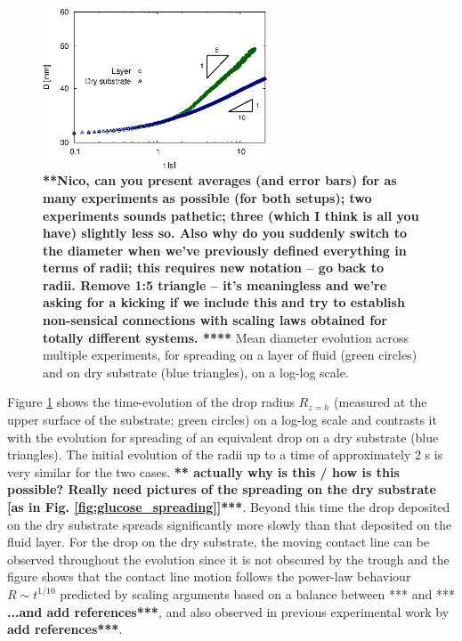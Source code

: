 \documentclass[aip,graphicx]{revtex4-1}
\begin{document}
\begin{figure}[!ht]
\centering
\includegraphics[width=0.6\textwidth]{figures/diam_vs_time_comp_layer_dry.eps}
\caption{{\bf ***Nico, can you present averages (and error bars) for as
  many experiments as possible (for both setups); two experiments
  sounds pathetic; three (which I think is all you have) slightly 
  less so. Also why do you suddenly switch to
  the diameter when we've previously defined everything in terms of
  radii; this requires new notation -- go back to radii. 
  Remove 1:5 triangle -- it's meaningless and we're asking for
  a kicking if we include this and try to establish non-sensical
  connections with scaling laws obtained for totally different
  systems. ****} Mean diameter evolution across multiple experiments, for
  spreading on a layer of fluid (green circles) and on dry substrate
  (blue triangles), on a log-log
  scale. }
\label{fig:diam_vs_time_comp_layer_dry}
\end{figure}


Figure \ref{fig:diam_vs_time_comp_layer_dry} shows the time-evolution
of the drop radius $R_{z=h}$ (measured at the upper surface
of the substrate; green circles) on a log-log scale and
contrasts it with the evolution for spreading of an equivalent drop 
on a dry substrate (blue triangles). The initial evolution 
of the radii up to a time of approximately 2 s is very similar for the two 
cases. {\bf *** actually why is this /  how is this possible? Really
  need pictures of the spreading on the dry substrate [as in Fig.
\ref{fig:glucose_spreading}]***}.
Beyond this time the drop deposited on the dry substrate spreads
significantly more slowly than that deposited on the fluid layer.
For the drop on the dry substrate, the moving contact line can be
observed throughout the evolution since it is not obscured by the
trough and the figure shows that the contact line motion follows
the power-law behaviour $R \sim t^{1/10}$ predicted by scaling
arguments based on a balance between *** and *** {\bf ...and add 
references***}, and also observed in previous experimental work by {\bf  add 
references***}.
\end{document}
